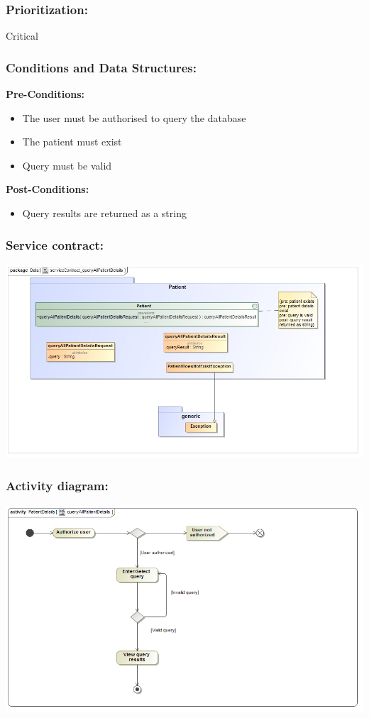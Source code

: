 \subsubsection{Prioritization:}
Critical
\subsubsection{Conditions and Data Structures:}
\textbf{Pre-Conditions:}
	\begin{itemize}
	\item The user must be authorised to query the database
	\item The patient must exist
	\item Query must be valid
	\end{itemize}
\textbf{Post-Conditions:}
	\begin{itemize}
	\item Query results are returned as a string
	\end{itemize}	
\subsubsection{Service contract:}
\includegraphics[width=1\linewidth]{./Graphics/3.jpg}
\subsubsection{Activity diagram:}
\includegraphics[width=1\linewidth]{./Graphics/queryAllPatientDetails.png}

